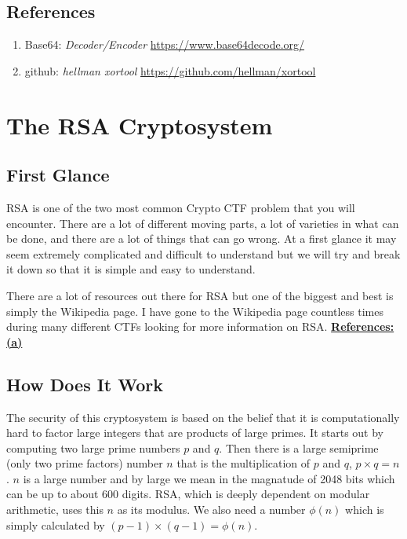 \documentclass{report}
\begin{document}
\vspace{1cm}
\section{References}
\label{ref:5}
\begin{enumerate}[label=(\alph*)]
\item Base64: \textit{Decoder/Encoder} \url{https://www.base64decode.org/}
\item github: \textit{hellman xortool} \url{https://github.com/hellman/xortool}
\end{enumerate}

\chapter{The RSA Cryptosystem}

\section{First Glance}
RSA is one of the two most common Crypto CTF problem that you will encounter.  There are a lot of different moving parts, a lot of varieties in what can be done, and there are a lot of things that can go wrong.  At a first glance it may seem extremely complicated and difficult to understand but we will try and break it down so that it is simple and easy to understand.

There are a lot of resources out there for RSA but one of the biggest and best is simply the Wikipedia page.  I have gone to the Wikipedia page countless times during many different CTFs looking for more information on RSA.  \hyperref[ref:6]{\textbf{References: (a)}}

\section{How Does It Work}
The security of this cryptosystem is based on the belief that it is computationally hard to factor large integers that are products of large primes.  It starts out by computing two large prime numbers $p$ and $q$.  Then there is a large semiprime (only two prime factors) number $n$ that is the multiplication of $p$ and $q$, $p \times q = n$. $n$ is a large number and by large we mean in the magnatude of 2048 bits which can be up to about 600 digits.  RSA, which is deeply dependent on modular arithmetic, uses this $n$ as its modulus.  We also need a number $\phi(n)$ which is simply calculated by $(p-1)\times(q-1) = \phi(n)$.  
\end{document}
